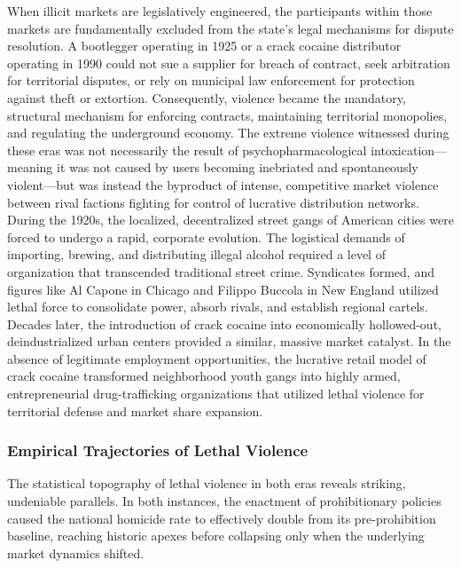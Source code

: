\documentclass[
]{article}
\begin{document}
When illicit markets are legislatively engineered, the participants
within those markets are fundamentally excluded from the state's legal
mechanisms for dispute resolution. A bootlegger operating in 1925 or a
crack cocaine distributor operating in 1990 could not sue a supplier for
breach of contract, seek arbitration for territorial disputes, or rely
on municipal law enforcement for protection against theft or extortion.
Consequently, violence became the mandatory, structural mechanism for
enforcing contracts, maintaining territorial monopolies, and regulating
the underground economy. The extreme violence witnessed during these
eras was not necessarily the result of psychopharmacological
intoxication---meaning it was not caused by users becoming inebriated
and spontaneously violent---but was instead the byproduct of intense,
competitive market violence between rival factions fighting for control
of lucrative distribution networks.\\
During the 1920s, the localized, decentralized street gangs of American
cities were forced to undergo a rapid, corporate evolution. The
logistical demands of importing, brewing, and distributing illegal
alcohol required a level of organization that transcended traditional
street crime. Syndicates formed, and figures like Al Capone in Chicago
and Filippo Buccola in New England utilized lethal force to consolidate
power, absorb rivals, and establish regional cartels. Decades later, the
introduction of crack cocaine into economically hollowed-out,
deindustrialized urban centers provided a similar, massive market
catalyst. In the absence of legitimate employment opportunities, the
lucrative retail model of crack cocaine transformed neighborhood youth
gangs into highly armed, entrepreneurial drug-trafficking organizations
that utilized lethal violence for territorial defense and market share
expansion.

\subsubsection{\texorpdfstring{\textbf{Empirical Trajectories of Lethal
Violence}}{Empirical Trajectories of Lethal Violence}}\label{empirical-trajectories-of-lethal-violence}

The statistical topography of lethal violence in both eras reveals
striking, undeniable parallels. In both instances, the enactment of
prohibitionary policies caused the national homicide rate to effectively
double from its pre-prohibition baseline, reaching historic apexes
before collapsing only when the underlying market dynamics shifted.
\end{document}
